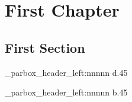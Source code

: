 \documentclass{book}
\begin{document}
\pagestyle{test}
\chapter{First Chapter}
\lipsum[1-6]
\section{First Section}
\lipsum[1-20]
\ExplSyntaxOn
\fboxsep=0pt
\fbox
  {
    \phd_parbox_header_left:nnnnn {d}{.45\textwidth}{
       \relax}{\raggedright}{\lorem}
  }
\fbox
  {
    \phd_parbox_header_left:nnnnn {b}{.45\textwidth}{\relax}{
       \raggedleft}{\lorem}
  }
\ExplSyntaxOff
\end{document}
